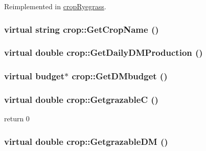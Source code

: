 Reimplemented in \hyperlink{classcrop_ryegrass_af6202e05ea5e0c9b91acd3deea308a24}{cropRyegrass}.\hypertarget{classcrop_a9410b9d5cb1b537736a52d426b682f93}{
\subsubsection[{GetCropName}]{\setlength{\rightskip}{0pt plus 5cm}virtual string crop::GetCropName ()}}
\label{classcrop_a9410b9d5cb1b537736a52d426b682f93}
\hypertarget{classcrop_a481d40295898bbc66581b5bc0849de75}{
\subsubsection[{GetDailyDMProduction}]{\setlength{\rightskip}{0pt plus 5cm}virtual double crop::GetDailyDMProduction ()}}
\label{classcrop_a481d40295898bbc66581b5bc0849de75}
\hypertarget{classcrop_aa0a404571c0eaf2f5d836f330d7c3b07}{
\subsubsection[{GetDMbudget}]{\setlength{\rightskip}{0pt plus 5cm}virtual {\bf budget}$\ast$ crop::GetDMbudget ()}}
\label{classcrop_aa0a404571c0eaf2f5d836f330d7c3b07}
\hypertarget{classcrop_ab856b98a56903245f5c0f0f173b74f35}{
\subsubsection[{GetgrazableC}]{\setlength{\rightskip}{0pt plus 5cm}virtual double crop::GetgrazableC ()}}
\label{classcrop_ab856b98a56903245f5c0f0f173b74f35}


return 0 \hypertarget{classcrop_aed591b1785dede13c062ab0af439a902}{
\subsubsection[{GetgrazableDM}]{\setlength{\rightskip}{0pt plus 5cm}virtual double crop::GetgrazableDM ()}}
\label{classcrop_aed591b1785dede13c062ab0af439a902}


